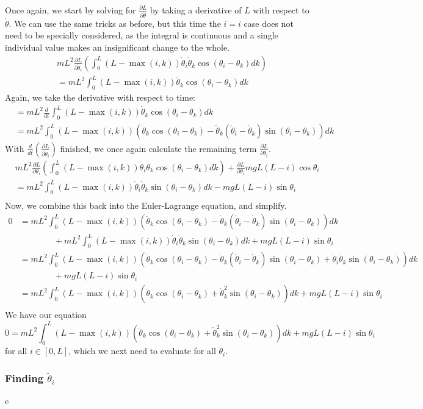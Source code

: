 \documentclass{article}
\begin{document}
Once again, we start by solving for $\frac{\partial L}{\partial \dot \theta}$ by taking a derivative of $L$ with respect to $\dot\theta$. We can use the same tricks as before, but this time the $i=i$ case does not need to be specially considered, as the integral is continuous and a single individual value makes an insignificant change to the whole.
\begin{align*}
&mL^2\frac{\partial L}{\partial \dot \theta_i}\left(\int_0^L(L-\max(i,k))\dot\theta_i\dot\theta_k\cos(\theta_i-\theta_k)dk\right)\\
&= mL^2\int_0^L(L-\max(i,k))\dot\theta_k\cos(\theta_i-\theta_k)dk
\end{align*}
Again, we take the derivative with respect to time:
\begin{align*}
&= mL^2\frac{d}{dt}\int_0^L(L-\max(i,k))\dot\theta_k\cos(\theta_i-\theta_k)dk\\
&= mL^2\int_0^L(L-\max(i,k))\left(\ddot\theta_k\cos(\theta_i-\theta_k)-\dot\theta_k(\dot\theta_i-\dot\theta_k)\sin(\theta_i-\theta_k)\right)dk
\end{align*}
With $\frac{d}{dt}\left(\frac{\partial L}{\partial \dot\theta_i}\right)$ finished, we once again calculate the remaining term $\frac{\partial L}{\partial \theta_i}$.
\begin{align*}
&mL^2\frac{\partial L}{\partial \theta_i}\left(\int_0^L(L-\max(i,k))\dot\theta_i\dot\theta_k\cos(\theta_i-\theta_k)dk\right) + \frac{\partial L}{\partial \theta_i}mgL(L-i)\cos\theta_i\\
&= mL^2\int_0^L(L-\max(i,k))\dot\theta_i\dot\theta_k\sin(\theta_i-\theta_k)dk - mgL(L-i)\sin\theta_i\\
\end{align*}
Now, we combine this back into the Euler-Lagrange equation, and simplify.
\begin{align*}
0&=mL^2\int_0^L(L-\max(i,k))\left(\ddot\theta_k\cos(\theta_i-\theta_k)-\dot\theta_k(\dot\theta_i-\dot\theta_k)\sin(\theta_i-\theta_k)\right)dk\\
&\qquad\qquad+ mL^2\int_0^L(L-\max(i,k))\dot\theta_i\dot\theta_k\sin(\theta_i-\theta_k)dk + mgL(L-i)\sin\theta_i\\
&=mL^2\int_0^L(L-\max(i,k))\left(\ddot\theta_k\cos(\theta_i-\theta_k)-\dot\theta_k(\dot\theta_i-\dot\theta_k)\sin(\theta_i-\theta_k) + \dot\theta_i\dot\theta_k\sin(\theta_i-\theta_k)\right)dk\\
&\qquad\qquad+ mgL(L-i)\sin\theta_i\\
&=mL^2\int_0^L(L-\max(i,k))\left(\ddot\theta_k\cos(\theta_i-\theta_k)+\dot\theta_k^2\sin(\theta_i-\theta_k)\right)dk+ mgL(L-i)\sin\theta_i\\
\end{align*}
We have our equation 
$$0=mL^2\int_0^L(L-\max(i,k))\left(\ddot\theta_k\cos(\theta_i-\theta_k)+\dot\theta_k^2\sin(\theta_i-\theta_k)\right)dk+ mgL(L-i)\sin\theta_i$$
for all $i \in [0,L]$, which we next need to evaluate for all $\ddot\theta_i$.
\subsubsection{Finding \texorpdfstring{$\ddot\theta_i$}{Angular Acceleration}}
e
\end{document}
